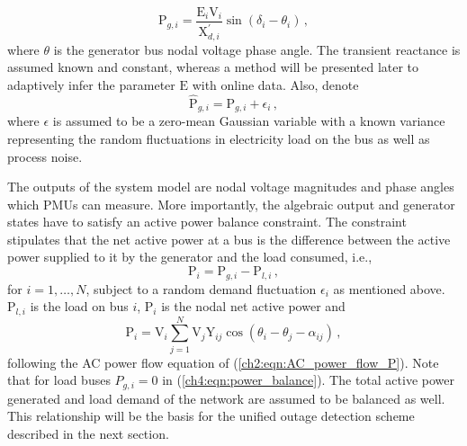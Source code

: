\begin{equation}
\label{ch4:eqn:ae_continuous}
\text{P}_{g, i} = \frac{\text{E}_i\text{V}_i}{\text{X}_{d, i}^{'}}\sin (\delta_i - \theta_i)\,,
\end{equation}
where $\theta$ is the generator bus nodal voltage phase angle. The transient reactance is assumed known and constant, whereas a method will be presented later to adaptively infer the parameter $\text{E}$ with online data. Also, denote 
$$
\hat{\text{P}}_{g, i} = \text{P}_{g, i} + \epsilon_i \,,
$$
where $\epsilon$ is assumed to be a zero-mean Gaussian variable with a known variance representing the random fluctuations in electricity load on the bus as well as process noise. 

The outputs of the system model are nodal voltage magnitudes and phase angles which PMUs can measure. More importantly, the algebraic output and generator states have to satisfy an active power balance constraint. The constraint stipulates that the net active power at a bus is the difference between the active power supplied to it by the generator and the load consumed, i.e.,
\begin{equation}
\label{ch4:eqn:power_balance}
\text{P}_i = \text{P}_{g, i} - \text{P}_{l, i} \,,
\end{equation}
for $i = 1, \dots, N$, subject to a random demand fluctuation $\epsilon_i$ as mentioned above. $\text{P}_{l, i}$ is the load on bus $i$, $\text{P}_{i}$ is the nodal net active power and 
\begin{equation}
\label{ch4:eqn:ac_pf}
\text{P}_{i} = \text{V}_i \sum_{j=1}^{N} \text{V}_j \text{Y}_{ij} \cos (\theta_i - \theta_j - \alpha_{ij}) \,,
\end{equation} following the AC power flow equation of (\ref{ch2:eqn:AC_power_flow_P}). Note that for load buses ${P}_{g, i} = 0$ in (\ref{ch4:eqn:power_balance}). The total active power generated and load demand of the network are assumed to be balanced as well. This relationship will be the basis for the unified outage detection scheme described in the next section. 

